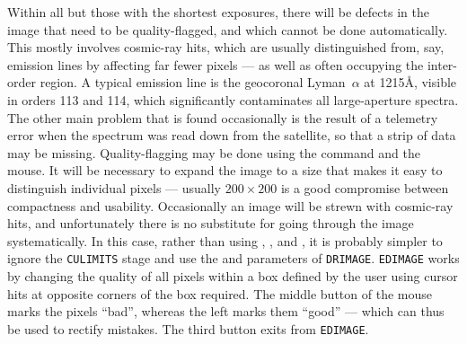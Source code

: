 \begin{latexonly}
Within all but those with the shortest exposures, there will be defects
in the image that need to be quality-flagged, and which cannot be done
automatically.  This mostly involves cosmic-ray hits, which are usually
distinguished from, say, emission lines by affecting far fewer pixels ---
as well as often occupying the inter-order region.  A typical emission line
is the geocoronal Lyman~$\alpha$ at 1215{\AA}, visible in orders 113 and 114,
which significantly contaminates all large-aperture spectra.
The other main problem that is found occasionally is the result of a telemetry
error when the spectrum was read down from the satellite, so that a strip of
data may be missing.  Quality-flagging may be done using the command
 and the mouse.
It will be necessary to expand the image to a
size that makes it easy to distinguish individual pixels --- usually
$200\times 200$ is a good compromise between compactness and usability.
Occasionally an image will be strewn with cosmic-ray hits, and unfortunately
there is no substitute for going through the image systematically.  In this
case, rather than using ,
, and ,
it is probably simpler to ignore the \verb+CULIMITS+ stage and use the
 and  parameters of
\verb+DRIMAGE+\@. \verb+EDIMAGE+ works by
changing the quality of all pixels within a box defined by the user using
cursor hits at opposite corners of the box required.  The middle button of the
mouse marks the pixels ``bad'', whereas the left marks them ``good'' --- which
can thus be used to rectify mistakes.  The third button exits from
\verb+EDIMAGE+\@.
\end{latexonly}

